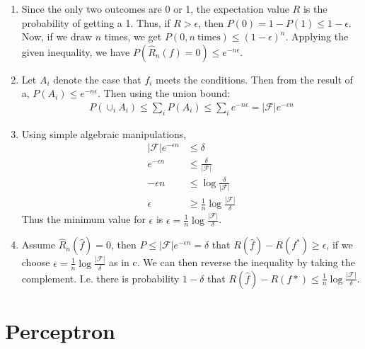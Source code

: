 \documentclass{article}
\begin{document}
\begin{enumerate}
        \item Since the only two outcomes are 0 or 1, the expectation value $R$ is the probability of getting a 1.
        Thus, if $R > \epsilon$, then $P(0) = 1 - P(1) \leq 1 - \epsilon$.
        Now, if we draw $n$ times, we get $P(0, n~\mathrm{times}) \leq (1- \epsilon)^n$.
        Applying the given inequality, we have $P(\hat{R}_n(f)=0) \leq e^{-n\epsilon}$.

        \item Let $A_i$ denote the case that $f_i$ meets the conditions.
        Then from the result of a, $P(A_i) \leq e^{-n\epsilon}$.
        Then using the union bound:
        \begin{align*}
                P(\cup_i A_i) \leq \sum_i P(A_i) \leq \sum_i e^{-n\epsilon} = |\mathcal{F}| e^{-\epsilon n}
        \end{align*}

        \item Using simple algebraic manipulations,
        \begin{align*}
                |\mathcal{F}| e^{-\epsilon n} &\leq \delta \\
                e^{-\epsilon n} &\leq \frac{\delta}{|\mathcal{F}|} \\
                -\epsilon n &\leq \log \frac{\delta}{|\mathcal{F}|} \\
                \epsilon &\geq \frac{1}{n} \log \frac{|\mathcal{F}|}{\delta}
        \end{align*}
        Thus the minimum value for $\epsilon$ is $\epsilon = \frac{1}{n} \log \frac{|\mathcal{F}|}{\delta}$.

        \item Assume $\hat{R}_n(\hat{f}) = 0$, then $P \leq |\mathcal{F}| e^{-\epsilon n} = \delta$ that $R(\hat{f}) - R(f^*) \geq \epsilon$, if we choose $\epsilon = \frac{1}{n} \log \frac{|\mathcal{F}|}{\delta}$ as in c.
        We can then reverse the inequality by taking the complement.
        I.e. there is probability $1 - \delta$ that $R(\hat{f}) - R(f*) \leq \frac{1}{n} \log \frac{|\mathcal{F}|}{\delta}$.
        
        
\end{enumerate}

\newpage
\section*{Perceptron}
\end{document}
